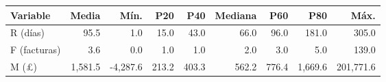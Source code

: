 \begin{tabular}{lrrrrrrrr}
\toprule
Variable & Media & Mín. & P20 & P40 & Mediana & P60 & P80 & Máx. \\
\midrule
R (días) & 95.5 & 1.0 & 15.0 & 43.0 & 66.0 & 96.0 & 181.0 & 305.0 \\
F (facturas) & 3.6 & 0.0 & 1.0 & 1.0 & 2.0 & 3.0 & 5.0 & 139.0 \\
M (\pounds) & 1,581.5 & -4,287.6 & 213.2 & 403.3 & 562.2 & 776.4 & 1,669.6 & 201,771.6 \\
\bottomrule
\end{tabular}
